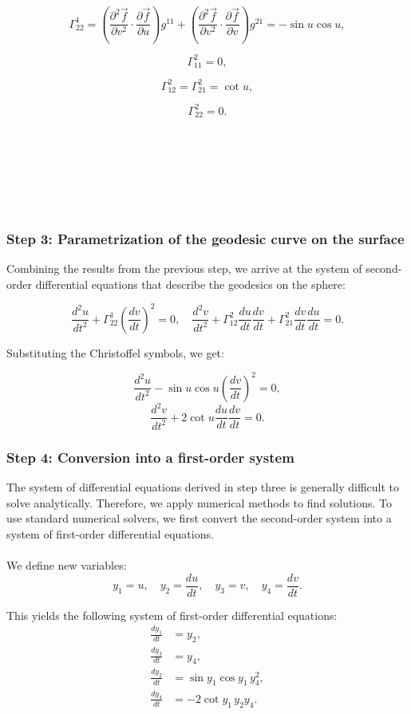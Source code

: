 \documentclass{article}
\begin{document}
		\[
		\Gamma^1_{22} = 
		\left( \frac{\partial^2 \vec{f}}{\partial v^2} \cdot \frac{\partial \vec{f}}{\partial u} \right) g^{11}
		+ \left( \frac{\partial^2 \vec{f}}{\partial v^2} \cdot \frac{\partial \vec{f}}{\partial v} \right) g^{21}
		= -\sin u \cos u,
		\]
		
		\[
		\Gamma^2_{11} = 0,
		\]
		
		\[
		\Gamma^2_{12} = \Gamma^2_{21} = \cot u,
		\]
		
		\[
		\Gamma^2_{22} = 0.
		\]
		\\
		\\
		\\
		\\
		\\
		\\
		
		\subsubsection{Step 3: Parametrization of the geodesic curve on the surface}
		Combining the results from the previous step, we arrive at the system of second-order differential equations that describe the geodesics on the sphere:
		
		\[
		\frac{d^2 u}{dt^2} + \Gamma^1_{22} \left( \frac{dv}{dt} \right)^2 = 0, \quad 
		\frac{d^2 v}{dt^2} + \Gamma^2_{12} \frac{du}{dt} \frac{dv}{dt} + \Gamma^2_{21} \frac{dv}{dt} \frac{du}{dt} = 0.
		\]
		
		Substituting the Christoffel symbols, we get:
		
		\[
		\frac{d^2 u}{dt^2} - \sin u \cos u \left( \frac{dv}{dt} \right)^2 = 0,
		\]
		\[
		\frac{d^2 v}{dt^2} + 2 \cot u \frac{du}{dt} \frac{dv}{dt} = 0.
		\]
		
		\subsubsection{Step 4: Conversion into a first-order system}
		The system of differential equations derived in step three is generally difficult to solve analytically. Therefore, we apply numerical methods to find solutions. To use standard numerical solvers, we first convert the second-order system into a system of first-order differential equations.
		\\\\
		We define new variables:
		\[
		y_1 = u, \quad y_2 = \frac{du}{dt}, \quad y_3 = v, \quad y_4 = \frac{dv}{dt}.
		\]
		
		This yields the following system of first-order differential equations:
		\begin{align*}
			\frac{dy_1}{dt} &= y_2, \\
			\frac{dy_3}{dt} &= y_4, \\
			\frac{dy_2}{dt} &= \sin y_1 \cos y_1 \, y_4^2, \\
			\frac{dy_4}{dt} &= -2 \cot y_1 \, y_2 y_4.
		\end{align*}
\end{document}
